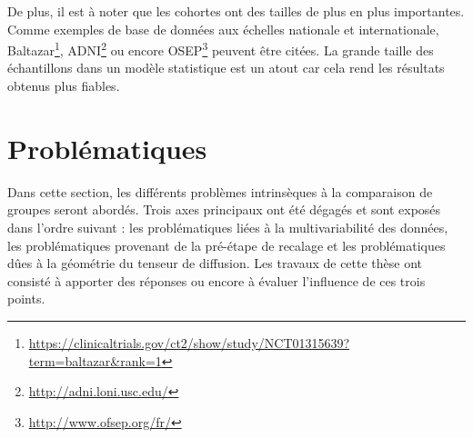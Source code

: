 De plus, il est à noter que les cohortes ont des tailles de plus en plus importantes.
Comme exemples de base de données aux échelles nationale et internationale, Baltazar\footnote{\url{https://clinicaltrials.gov/ct2/show/study/NCT01315639?term=baltazar&rank=1}}, ADNI\footnote{\url{http://adni.loni.usc.edu/}} ou encore OSEP\footnote{\url{http://www.ofsep.org/fr/}} peuvent être citées.
La grande taille des échantillons dans un modèle statistique est un atout car cela rend les résultats obtenus plus fiables.


\section{Problématiques}
\label{problematiques}
Dans cette section, les différents problèmes intrinsèques à la comparaison de groupes seront abordés.
Trois axes principaux ont été dégagés et sont exposés dans l'ordre suivant : 
les problématiques liées à la multivariabilité des données, les problématiques provenant de la pré-étape de recalage et
les problématiques dûes à la géométrie du tenseur de diffusion.
Les travaux de cette thèse ont consisté à apporter des réponses ou encore à évaluer l'influence de ces trois points.

